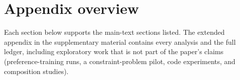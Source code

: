 
\section*{Appendix overview}
Each section below supports the main-text sections listed. The extended appendix in the supplementary material contains every analysis and the full ledger, including exploratory work that is not part of the paper's claims (preference-training runs, a constraint-problem pilot, code experiments, and composition studies).

